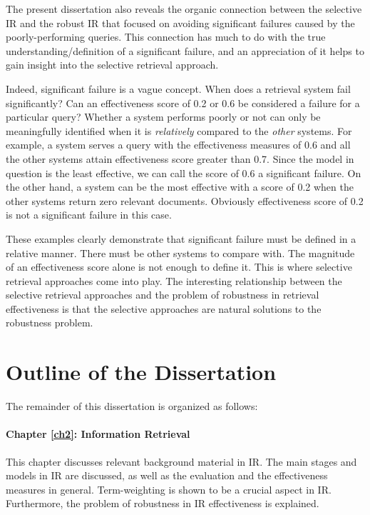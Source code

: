 The present dissertation also reveals the organic connection between the selective IR and the robust IR that focused on avoiding significant failures caused by the poorly-performing queries. 
This connection has much to do with the true understanding/definition of a significant failure, and an appreciation of it helps to gain insight into the selective retrieval approach.

Indeed, significant failure is a vague concept. 
When does a retrieval system fail significantly? 
Can an effectiveness score of 0.2 or 0.6 be considered a failure for a particular query?
Whether a system performs poorly or not can only be meaningfully identified when it is \emph{relatively} compared to the \emph{other} systems.
For example, a system serves a query with the effectiveness measures of 0.6 and all the other systems attain effectiveness score greater than 0.7. 
Since the model in question is the least effective, we can call the score of 0.6 a significant failure.
On the other hand, a system can be the most effective with a score of 0.2 when the other systems return zero relevant documents.
Obviously effectiveness score of 0.2 is not a significant failure in this case.

These examples clearly demonstrate that significant failure must be defined in a relative manner.
There must be other systems to compare with. 
The magnitude of an effectiveness score alone is not enough to define it. 
This is where selective retrieval approaches come into play.
The interesting relationship between the selective retrieval approaches and the problem of robustness in retrieval effectiveness is that the selective approaches are natural solutions to the robustness problem.


\section{Outline of the Dissertation}
The remainder of this dissertation is organized as follows:

\paragraph{Chapter \ref{ch2}: Information Retrieval}
This chapter discusses relevant background material in IR. The main stages and models in IR are discussed, as well as the evaluation and the effectiveness measures in general. 
Term-weighting is shown to be a crucial aspect in IR.
Furthermore, the problem of robustness in IR effectiveness is explained.

